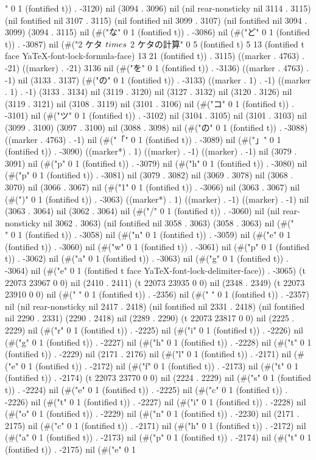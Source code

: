 " 0 1 (fontified t)) . -3120) nil (3094 . 3096) nil (nil rear-nonsticky nil 3114 . 3115) (nil fontified nil 3107 . 3115) (nil fontified nil 3099 . 3107) (nil fontified nil 3094 . 3099) (3094 . 3115) nil (#("な" 0 1 (fontified t)) . -3086) nil (#("ど" 0 1 (fontified t)) . -3087) nil (#("2 ケタ $\\times$ 2 ケタの計算" 0 5 (fontified t) 5 13 (fontified t face YaTeX-font-lock-formula-face) 13 21 (fontified t)) . 3115) ((marker . 4763) . -21) ((marker) . -21) 3136 nil (#("を" 0 1 (fontified t)) . -3136) ((marker . 4763) . -1) nil (3133 . 3137) (#("の" 0 1 (fontified t)) . -3133) ((marker . 1) . -1) ((marker . 1) . -1) (3133 . 3134) nil (3119 . 3120) nil (3127 . 3132) nil (3120 . 3126) nil (3119 . 3121) nil (3108 . 3119) nil (3101 . 3106) nil (#("コ" 0 1 (fontified t)) . -3101) nil (#("ツ" 0 1 (fontified t)) . -3102) nil (3104 . 3105) nil (3101 . 3103) nil (3099 . 3100) (3097 . 3100) nil (3088 . 3098) nil (#("の" 0 1 (fontified t)) . -3088) ((marker . 4763) . -1) nil (#("「" 0 1 (fontified t)) . -3089) nil (#("」" 0 1 (fontified t)) . -3090) ((marker*) . 1) ((marker) . -1) ((marker) . -1) nil (3079 . 3091) nil (#("p" 0 1 (fontified t)) . -3079) nil (#("h" 0 1 (fontified t)) . -3080) nil (#("p" 0 1 (fontified t)) . -3081) nil (3079 . 3082) nil (3069 . 3078) nil (3068 . 3070) nil (3066 . 3067) nil (#("1" 0 1 (fontified t)) . -3066) nil (3063 . 3067) nil (#(")" 0 1 (fontified t)) . -3063) ((marker*) . 1) ((marker) . -1) ((marker) . -1) nil (3063 . 3064) nil (3062 . 3064) nil (#("/" 0 1 (fontified t)) . -3060) nil (nil rear-nonsticky nil 3062 . 3063) (nil fontified nil 3058 . 3063) (3058 . 3063) nil (#("\\" 0 1 (fontified t)) . -3058) nil (#("n" 0 1 (fontified t)) . -3059) nil (#("e" 0 1 (fontified t)) . -3060) nil (#("w" 0 1 (fontified t)) . -3061) nil (#("p" 0 1 (fontified t)) . -3062) nil (#("a" 0 1 (fontified t)) . -3063) nil (#("g" 0 1 (fontified t)) . -3064) nil (#("e" 0 1 (fontified t face YaTeX-font-lock-delimiter-face)) . -3065) (t 22073 23967 0 0) nil (2410 . 2411) (t 22073 23935 0 0) nil (2348 . 2349) (t 22073 23910 0 0) nil (#(" " 0 1 (fontified t)) . -2356) nil (#(" " 0 1 (fontified t)) . -2357) nil (nil rear-nonsticky nil 2417 . 2418) (nil fontified nil 2331 . 2418) (nil fontified nil 2290 . 2331) (2290 . 2418) nil (2289 . 2290) (t 22073 23817 0 0) nil (2225 . 2229) nil (#("r" 0 1 (fontified t)) . -2225) nil (#("i" 0 1 (fontified t)) . -2226) nil (#("g" 0 1 (fontified t)) . -2227) nil (#("h" 0 1 (fontified t)) . -2228) nil (#("t" 0 1 (fontified t)) . -2229) nil (2171 . 2176) nil (#("l" 0 1 (fontified t)) . -2171) nil (#("e" 0 1 (fontified t)) . -2172) nil (#("f" 0 1 (fontified t)) . -2173) nil (#("t" 0 1 (fontified t)) . -2174) (t 22073 23770 0 0) nil (2224 . 2229) nil (#("s" 0 1 (fontified t)) . -2224) nil (#("e" 0 1 (fontified t)) . -2225) nil (#("c" 0 1 (fontified t)) . -2226) nil (#("t" 0 1 (fontified t)) . -2227) nil (#("i" 0 1 (fontified t)) . -2228) nil (#("o" 0 1 (fontified t)) . -2229) nil (#("n" 0 1 (fontified t)) . -2230) nil (2171 . 2175) nil (#("c" 0 1 (fontified t)) . -2171) nil (#("h" 0 1 (fontified t)) . -2172) nil (#("a" 0 1 (fontified t)) . -2173) nil (#("p" 0 1 (fontified t)) . -2174) nil (#("t" 0 1 (fontified t)) . -2175) nil (#("e" 0 1 